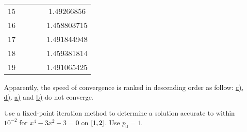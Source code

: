\documentclass[../../../../Assignments]{subfiles}
\begin{document}
\begin{solution}
\begin{longtable}{r c c S[table-format=1.9] S[table-format=1.9]}
           15  &                  &                  &               &  1.49266856   \\
           16  &                  &                  &               &  1.458803715  \\
           17  &                  &                  &               &  1.491844948  \\
           18  &                  &                  &               &  1.459381814  \\
           19  &                  &                  &               &  1.491065425  \\
        \bottomrule
    \end{longtable}

    Apparently, the speed of convergence is ranked in descending order as
    follow: \hyperref[exer:2.2.4:c]{c)}, \hyperref[exer:2.2.4:d]{d)}.
    \hyperref[exer:2.2.4:a]{a)} and \hyperref[exer:2.2.4:b]{b)} do not converge.
\end{solution}

\begin{exercise}
    Use a fixed-point iteration method to determine a solution accurate to
    within \(10^{-2}\) for \(x^4 - 3x^2 - 3 = 0\) on \(\interval{1}{2}\). Use
    \(p_0 = 1\).
\end{exercise}
\end{document}
